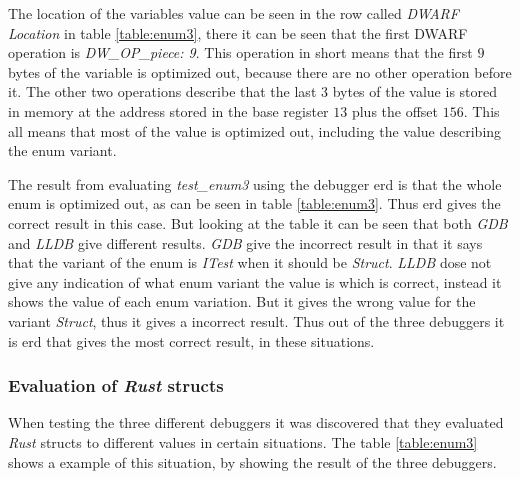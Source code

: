 The location of the variables value can be seen in the row called \emph{DWARF Location} in table \ref{table:enum3}, there it can be seen that the first \gls{DWARF} operation is \emph{DW\_OP\_piece: 9}.
This operation in short means that the first $9$ bytes of the variable is optimized out, because there are no other operation before it.
The other two operations describe that the last $3$ bytes of the value is stored in memory at the address stored in the base register $13$ plus the offset $156$.
This all means that most of the value is optimized out, including the value describing the enum variant.


The result from evaluating \emph{test\_enum3} using the debugger \gls{erd} is that the whole enum is optimized out, as can be seen in table \ref{table:enum3}.
Thus \gls{erd} gives the correct result in this case.
But looking at the table it can be seen that both \emph{GDB} and \emph{LLDB} give different results.
\emph{GDB} give the incorrect result in that it says that the variant of the enum is \emph{ITest} when it should be \emph{Struct}.
\emph{LLDB} dose not give any indication of what enum variant the value is which is correct, instead it shows the value of each enum variation.
But it gives the wrong value for the variant \emph{Struct}, thus it gives a incorrect result.
Thus out of the three debuggers it is \gls{erd} that gives the most correct result, in these situations.



\subsubsection{Evaluation of \emph{Rust} structs}
When testing the three different debuggers it was discovered that they evaluated \emph{Rust} structs to different values in certain situations.
The table \ref{table:enum3} shows a example of this situation, by showing the result of the three debuggers.


